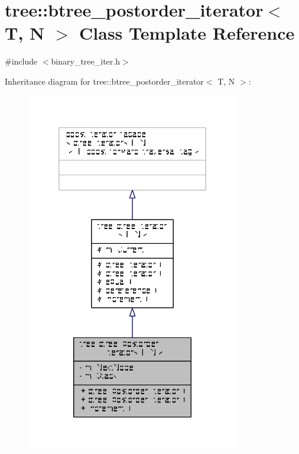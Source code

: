 \hypertarget{classtree_1_1btree__postorder__iterator}{\section{tree\-:\-:btree\-\_\-postorder\-\_\-iterator$<$ T, N $>$ Class Template Reference}
\label{classtree_1_1btree__postorder__iterator}
}


{\ttfamily \#include $<$binary\-\_\-tree\-\_\-iter.\-h$>$}



Inheritance diagram for tree\-:\-:btree\-\_\-postorder\-\_\-iterator$<$ T, N $>$\-:
\nopagebreak
\begin{figure}[H]
\begin{center}
\leavevmode
\includegraphics[width=264pt]{classtree_1_1btree__postorder__iterator__inherit__graph}
\end{center}
\end{figure}


